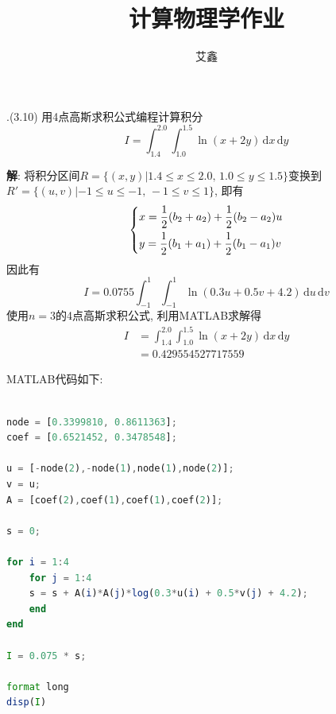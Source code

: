 \documentclass{ctexart}
\title{计算物理学作业}
\author{艾鑫}
\newcounter{mycnt}
\newenvironment{problem}[1][1.1]{\noindent \stepcounter{mycnt}\themycnt.(#1)}{

}
\newenvironment{answer}{\textbf{解}:}{
\vspace{0.5cm}
}
\newcommand\diff{\,\mathrm{d}}
\begin{document}
\maketitle

\begin{problem}[3.10]
用4点高斯求积公式编程计算积分
\begin{equation}
  I = \int_{1.4}^{2.0} \int_{1.0}^{1.5} \ln (x+2y) \diff x \diff y
\end{equation}
\end{problem}

\begin{answer}
  将积分区间$R = \{(x,y)|1.4 \leq x \leq 2.0, \, 1.0 \leq y \leq 1.5\}$变换到$R' = \{(u,v)|-1 \leq u \leq -1, \, -1 \leq v \leq 1\}$, 即有
  \begin{equation}
    \left\{
      \begin{lgathered}
        x = \frac{1}{2}(b_2 + a_2) + \frac{1}{2} (b_2 - a_2)u \\
        y = \frac{1}{2}(b_1 + a_1) + \frac{1}{2} (b_1 - a_1)v
      \end{lgathered}
    \right.
  \end{equation}
因此有
\begin{equation}
  I = 0.0755 \int_{-1}^{1} \int_{-1}^{1} \ln (0.3 u + 0.5 v + 4.2) \diff u \diff v
\end{equation}
使用$n=3$的4点高斯求积公式, 利用MATLAB求解得
\begin{equation}
  \begin{split}
  I &= \int_{1.4}^{2.0} \int_{1.0}^{1.5} \ln (x+2y) \diff x \diff y \\
    &= 0.429554527717559
  \end{split}
\end{equation}

MATLAB代码如下:
\begin{lstlisting}[language=Octave]
% 第一题 用四点高斯求积公式求二重积分

node = [0.3399810, 0.8611363];
coef = [0.6521452, 0.3478548];

u = [-node(2),-node(1),node(1),node(2)];
v = u;
A = [coef(2),coef(1),coef(1),coef(2)];

s = 0;

for i = 1:4
    for j = 1:4
	s = s + A(i)*A(j)*log(0.3*u(i) + 0.5*v(j) + 4.2);
    end
end

I = 0.075 * s;

format long
disp(I)
\end{lstlisting}

\end{answer}
\end{document}
